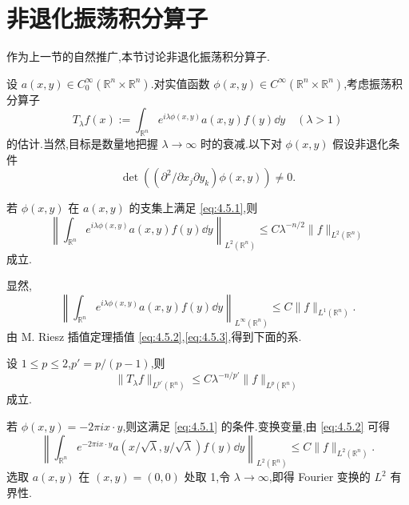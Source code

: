\section{非退化振荡积分算子}\label{sec:4.5}


作为上一节的自然推广,本节讨论非退化振荡积分算子.

设 $a(x, y) \in C_{0}^{\infty}(\mathbb{R}^{n}\times\mathbb{R}^{n})$.对实值函数 $\phi(x, y) \in C^{\infty}(\mathbb{R}^{n}\times\mathbb{R}^{n})$,考虑振荡积分算子
\begin{equation*}
T_{\lambda}f(x) := \int_{\mathbb{R}^{n}}e^{i\lambda\phi(x, y)}a(x, y)f(y)\dd y \quad (\lambda > 1)
\end{equation*}
的估计.当然,目标是数量地把握 $\lambda \to \infty$ 时的衰减.以下对 $\phi(x, y)$ 假设非退化条件
\begin{equation}
\det\left((\partial^{2}/\partial x_{j}\partial y_{k})\phi(x, y)\right) \neq 0.\tag{4.5.1}
\label{eq:4.5.1}\end{equation}

\begin{theorem}\label{thm:4.5.1}
若 $\phi(x, y)$ 在 $a(x, y)$ 的支集上满足 \eqref{eq:4.5.1},则
\begin{equation}
\left\|\int_{\mathbb{R}^{n}}e^{i\lambda\phi(x, y)}a(x, y)f(y)\dd y\right\|_{L^{2}(\mathbb{R}^{n})} \leq C\lambda^{-n/2}\|f\|_{L^{2}(\mathbb{R}^{n})}\tag{4.5.2}
\label{eq:4.5.2}\end{equation}
成立.
\end{theorem}

显然,
\begin{equation}
\left\|\int_{\mathbb{R}^{n}}e^{i\lambda\phi(x, y)}a(x, y)f(y)\dd y\right\|_{L^{\infty}(\mathbb{R}^{n})} \leq C\|f\|_{L^{1}(\mathbb{R}^{n})}.\tag{4.5.3}
\label{eq:4.5.3}\end{equation}
由 M. Riesz 插值定理插值 \eqref{eq:4.5.2},\eqref{eq:4.5.3},得到下面的系.

\begin{corollary}\label{cor:4.5.2}
设 $1 \leq p \leq 2$,$p' = p/(p-1)$,则
\begin{equation}
\|T_{\lambda}f\|_{L^{p'}(\mathbb{R}^{n})} \leq C\lambda^{-n/p'}\|f\|_{L^{p}(\mathbb{R}^{n})}\tag{4.5.4}
\label{eq:4.5.4}\end{equation}
成立.
\end{corollary}

若 $\phi(x, y) = -2\pi ix\cdot y$,则这满足 \eqref{eq:4.5.1} 的条件.变换变量,由 \eqref{eq:4.5.2} 可得
\begin{equation*}
\left\|\int_{\mathbb{R}^{n}}e^{-2\pi i x\cdot y}a(x/\sqrt{\lambda}, y/\sqrt{\lambda})f(y)\dd y\right\|_{L^{2}(\mathbb{R}^{n})} \leq C\|f\|_{L^{2}(\mathbb{R}^{n})}.
\end{equation*}
选取 $a(x, y)$ 在 $(x, y) = (0, 0)$ 处取 1,令 $\lambda \to \infty$,即得 Fourier 变换的 $L^{2}$ 有界性.


